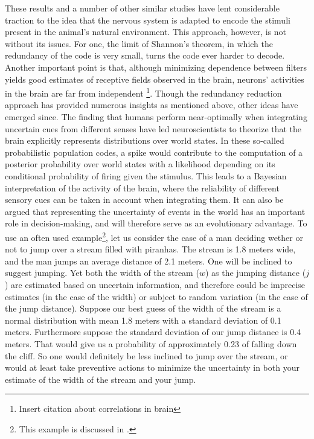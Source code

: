 These results and a number of other similar studies have lent considerable traction to the idea that the nervous system is adapted to encode the stimuli present in the animal's natural environment. This approach, however, is not without its issues. For one, the limit of Shannon's theorem, in which the redundancy of the code is very small, turns the code ever harder to decode. Another important point is that, although minimizing dependence between filters yields good estimates of receptive fields observed in the brain, neurons' activities in the brain are far from independent \footnote{Insert citation about correlations in brain}. Though the redundancy reduction approach has provided numerous insights as mentioned above, other ideas have emerged since. The finding that humans perform near-optimally when integrating uncertain cues from different senses have led neuroscientists to theorize that the brain explicitly represents distributions over world states\cite{Ernst2002,Ma2006}. In these so-called probabilistic population codes, a spike would contribute to the computation of a posterior probability over world states with a likelihood depending on its conditional probability of firing given the stimulus. This leads to a Bayesian interpretation of the activity of the brain, where the reliability of different sensory cues can be taken in account when integrating them. It can also be argued that representing the uncertainty of events in the world has an important role in decision-making, and will therefore serve as an evolutionary advantage. To use an often used example\footnote{This example is discussed in \citep{Ma2006}.}, let us consider the case of a man deciding wether or not to jump over a stream filled with piranhas. The stream is 1.8 meters wide, and the man jumps an average distance of 2.1 meters. One will be inclined to suggest jumping. Yet both the width of the stream ($w$) as the jumping distance ($j$) are estimated based on uncertain information, and therefore could be imprecise estimates (in the case of the width) or subject to random variation (in the case of the jump distance). Suppose our best guess of the width of the stream is a normal distribution with mean 1.8 meters with a standard deviation of 0.1 meters. Furthermore suppose the standard deviation of our jump distance is 0.4 meters. That would give us a probability of approximately 0.23 of falling down the cliff. So one would definitely be less inclined to jump over the stream, or would at least take preventive actions to minimize the uncertainty in both your estimate of the width of the stream and your jump.\par

